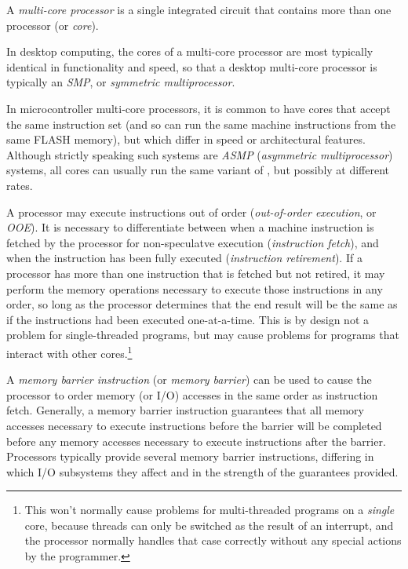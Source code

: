 A \emph{multi-core processor} is 
a single integrated circuit that contains more than one 
processor (or \emph{core}).  

In desktop computing, the cores of a multi-core processor 
are most typically identical in functionality and speed, so 
that a desktop multi-core processor is typically an 
\emph{SMP}, or 
\emph{symmetric 
multiprocessor}.  

In microcontroller multi-core processors, it is common to 
have cores that accept the same instruction set (and so can 
run the same machine instructions from the same FLASH 
memory), but which differ in speed or architectural 
features.  Although strictly speaking such systems are 
\emph{ASMP} (\emph{asymmetric multiprocessor}) systems, 
all cores can usually run the same variant of
\emph{\productbasenameshort{}}, but possibly at different 
rates.  

A processor may execute instructions out of order 
(\emph{out-of-order 
execution}, or \emph{OOE})\@.  
It is necessary to differentiate between when a machine 
instruction is fetched by the processor for non-speculatve 
execution (\emph{instruction 
fetch}), and when the instruction has been fully executed 
(\emph{instruction 
retirement}).  If a processor has more than one instruction 
that is fetched but not retired, it may perform the memory 
operations necessary to execute those 
instructions in any order, so long as the processor 
determines that the end result will be the same as if the 
instructions had been executed one-at-a-time.  This is by 
design not a problem for single-threaded programs, but may 
cause problems for programs that interact with other 
cores.\footnote{This won't normally cause problems for 
multi-threaded programs on a \emph{single} core, because
threads can only be switched as the result of an interrupt, 
and the processor normally handles that case correctly 
without any special actions by the programmer.} 

A \emph{memory barrier instruction} 
(or \emph{memory barrier}) can be used to cause the 
processor to order memory (or I/O) accesses in the same 
order as instruction fetch.  Generally, a memory barrier 
instruction guarantees that all memory accesses necessary to 
execute instructions before the barrier will be completed 
before any memory accesses necessary to execute instructions 
after the barrier.  Processors typically provide several 
memory barrier instructions, differing in which I/O 
subsystems they affect and in the strength of the guarantees 
provided.  


